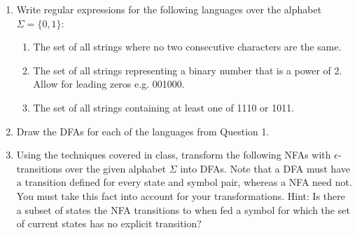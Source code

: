 \documentclass[11pt]{article}
\begin{document}
\begin{enumerate}
  \item Write regular expressions for the following languages over the alphabet $\Sigma = \{0, 1\}$:
  \begin{enumerate}
    \item The set of all strings where no two consecutive characters are the same.
    \item The set of all strings representing a binary number that is a power of 2. Allow for leading zeros e.g. 001000.
    \item The set of all strings containing at least one of 1110 or 1011.
  \end{enumerate}
  
  \item Draw the DFAs for each of the languages from Question 1.
  
  \item Using the techniques covered in class, transform the following NFAs with $\epsilon$-transitions over the given alphabet $\Sigma$ into DFAs. Note that a DFA must have a transition defined for every state and symbol pair, whereas a NFA need not. You must take this fact into account for your transformations. Hint: Is there a subset of states the NFA transitions to when fed a symbol for which the set of current states has no explicit transition?
  

\end{enumerate}
\end{document}
